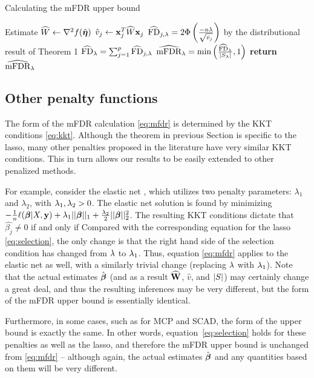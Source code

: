\begin{algorithm*}
\caption{Calculating the mFDR upper bound}\label{Alg:mfdr}
\begin{algorithmic}[10]
\Procedure{}{}
	\State Estimate $\widehat{W} \gets \nabla^2f(\hat{\boldsymbol{\eta}})$
		\State $\hat{v}_j \gets \mathbf{x}_j^T\widehat{W}\mathbf{x}_j$
		\State $\widehat{\textrm{FD}}_{j, \lambda} = 2 \Phi \left(\frac{-n\lambda}{\sqrt{\hat{v}_j}}\right)$  by the distributional result of Theorem 1
	\EndFor
	\State $\widehat{\textrm{FD}}_\lambda =  \sum_{j=1}^{p} \widehat{\textrm{FD}}_{j, \lambda}$
	\State $\widehat{\textrm{mFDR}}_\lambda = \text{min}\left(\frac{\widehat{\textrm{FD}}_\lambda}{|S_\lambda|}, 1 \right)$
\EndProcedure
\State \textbf{return} $\widehat{\textrm{mFDR}}_\lambda $
\end{algorithmic}
\end{algorithm*}

\subsection{Other penalty functions}

The form of the mFDR calculation \eqref{eq:mfdr} is determined by the KKT conditions \eqref{eq:kkt}.  Although the theorem in previous Section is specific to the lasso, many other penalties proposed in the literature have very similar KKT conditions. This in turn allows our results to be easily extended to other penalized methods.

For example, consider the elastic net \citep{Elastic_Net}, which utilizes two penalty parameters: $\lambda_1$ and $\lambda_2$, with $\lambda_1, \lambda_2 >0$. The elastic net solution is found by minimizing $-\frac{1}{n} \ell(\boldsymbol{\beta}|X,\mathbf{y}) + \lambda_1 ||\boldsymbol{\beta}||_1 + \frac{\lambda_2}{2}||\boldsymbol{\beta}||_{2}^2 $. The resulting KKT conditions dictate that $\hat{\beta_j} \neq 0$ if and only if
Compared with the corresponding equation for the lasso \eqref{eq:selection}, the only change is that the right hand side of the selection condition has changed from $\lambda$ to $\lambda_1$.  Thus, equation \eqref{eq:mfdr} applies to the elastic net as well, with a similarly trivial change (replacing $\lambda$ with $\lambda_1$).  Note that the actual estimates $\hat{\boldsymbol{\beta}}$ (and as a result $\widehat{\mathbf{W}}$, $\hat{v}$, and $\left\lvert S\right\rvert$) may certainly change a great deal, and thus the resulting inferences may be very different, but the form of the mFDR upper bound is essentially identical.

Furthermore, in some cases, such as for MCP and SCAD, the form of the upper bound is exactly the same.  In other words, equation~\eqref{eq:selection} holds for these penalties as well as the lasso, and therefore the mFDR upper bound is unchanged from \eqref{eq:mfdr} -- although again, the actual estimates $\hat{\boldsymbol{\beta}}$ and any quantities based on them will be very different.

